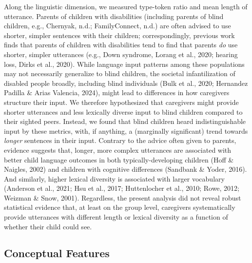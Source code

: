 \documentclass[
  man,floatsintext]{apa6}
\begin{document}
Along the linguistic dimension, we measured type-token ratio and mean length of utterance. Parents of children with disabilities (including parents of blind children, e.g., Chernyak, n.d.; FamilyConnect, n.d.) are often advised to use shorter, simpler sentences with their children; correspondingly, previous work finds that parents of children with disabilities tend to find that parents \emph{do} use shorter, simpler utterances (e.g., Down syndrome, Lorang et al., 2020; hearing loss, Dirks et al., 2020). While language input patterns among these populations may not necessarily generalize to blind children, the societal infantilization of disabled people broadly, including blind individuals (Bulk et al., 2020; Hernandez Padilla \& Arias Valencia, 2024), might lead to differences in how caregivers structure their input. We therefore hypothesized that caregivers might provide shorter utterances and less lexically diverse input to blind children compared to their sighted peers. Instead, we found that blind children heard indistinguishable input by these metrics, with, if anything, a (marginally significant) trend towards \emph{longer} sentences in their input. Contrary to the advice often given to parents, evidence suggests that, longer, more complex utterances are associated with better child language outcomes in both typically-developing children (Hoff \& Naigles, 2002) and children with cognitive differences (Sandbank \& Yoder, 2016). And similarly, higher lexical diversity is associated with larger vocabulary (Anderson et al., 2021; Hsu et al., 2017; Huttenlocher et al., 2010; Rowe, 2012; Weizman \& Snow, 2001). Regardless, the present analysis did not reveal robust statistical evidence that, at least on the group level, caregivers systematically provide utterances with different length or lexical diversity as a function of whether their child could see.

\hypertarget{conceptual-features-2}{%
\subsection{Conceptual Features}\label{conceptual-features-2}}
\end{document}
